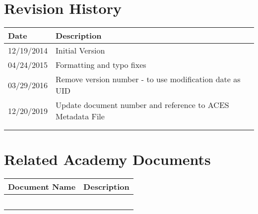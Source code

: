 \prelimsectionformat	%
\chapter{Revision History}

\begin{tabularx}{\linewidth}{|l|X|}
    \hline
    Date       & Description \\ \hline
    12/19/2014 & Initial Version
    \\ \hline
    04/24/2015 & Formatting and typo fixes \\ \hline
    03/29/2016 & Remove version number - to use modification date as UID \\ \hline
    12/20/2019 & Update document number and reference to ACES Metadata File \\ \hline
    &   \\ \hline
    &   \\ \hline
\end{tabularx}

\vspace{0.25in} %
\chapter{Related Academy Documents} %
\begin{tabularx}{\linewidth}{|l|X|}
    \hline
    Document Name & Description \\ \hline
    & \\ \hline
    & \\ \hline
    & \\ \hline
    & \\ \hline
    & \\ \hline
\end{tabularx}